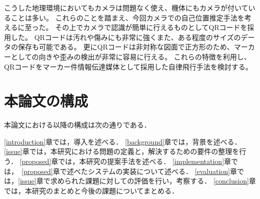 こうした地理環境においてもカメラは問題なく使え、機体にもカメラが付いていることは多い。
これらのことを踏まえ、今回カメラでの自己位置推定手法を考えるに至った。
その上でカメラで認識が簡単に行えるものとしてQRコードを採用した。
QRコードは汚れや傷みにも非常に強くまた、ある程度のサイズのデータの保存も可能である。
更にQRコードは非対称な図面で正方形のため、マーカーとしての向きや歪みの検出が非常に容易に行える。
これらの特徴を利用し、QRコードをマーカー件情報伝達媒体として採用した自律飛行手法を検討する。


\section{本論文の構成}

本論文における以降の構成は次の通りである．

\ref{introduction}章では，導入を述べる．
\ref{background}章では，背景を述べる．
\ref{issue}章では，本研究における問題の定義と，解決するための要件の整理を行う．
\ref{proposed}章では，本研究の提案手法を述べる．
\ref{implementation}章では，~\ref{proposed}章で述べたシステムの実装について述べる．
\ref{evaluation}章では，\ref{issue}章で求められた課題に対しての評価を行い，考察する．
\ref{conclusion}章では，本研究のまとめと今後の課題についてまとめる．


